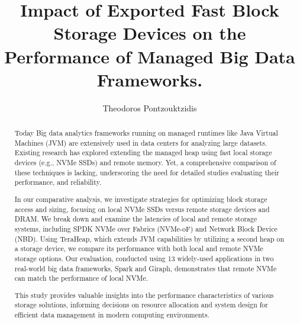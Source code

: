 \documentclass[nonacm,sigplan]{acmart}
\begin{document}
\title{Impact of Exported Fast Block Storage Devices on the Performance of Managed Big Data Frameworks.}

\author{Theodoros Pontzouktzidis} %

\begin{abstract}
\par Today Big data analytics frameworks running on managed runtimes like Java Virtual Machines (JVM) are extensively used in data centers for analyzing large datasets. Existing research has explored extending the managed heap using fast local storage devices (e.g., NVMe SSDs) and remote memory. Yet, a comprehensive comparison of these techniques is lacking, underscoring the need for detailed studies evaluating their performance, and reliability.
\par In our comparative analysis, we investigate strategies for optimizing block storage access and sizing, focusing on local NVMe SSDs versus remote storage devices and DRAM. We break down and examine the latencies of local and remote storage systems, including SPDK NVMe over Fabrics (NVMe-oF) and Network Block Device (NBD). Using TeraHeap, which extends JVM capabilities by utilizing a second heap on a storage device, we compare its performance with both local and remote NVMe storage options. Our evaluation, conducted using 13 widely-used applications in two real-world big data frameworks, Spark and Giraph, demonstrates that remote NVMe can match the performance of local NVMe. \par This study provides valuable insights into the performance characteristics of various storage solutions, informing decisions on resource allocation and system design for efficient data management in modern computing environments. 
\end{abstract}



\maketitle %
\pagestyle{plain} %










\end{document}
